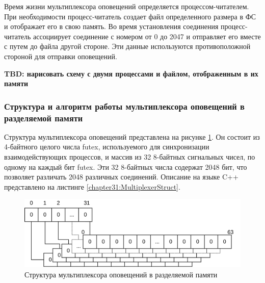 Время жизни мультиплексора оповещений определяется процессом-читателем. При необходимости процесс-читатель создает файл определенного размера в ФС и отображает его в свою память. Во время установления соединения процесс-читатель ассоциирует соединение с номером от 0 до 2047 и отправляет его вместе с путем до файла другой стороне. Эти данные используются противоположной стороной для отправки оповещений.

\textbf{TBD: нарисовать схему с двумя процессами и файлом, отображенным в их памяти}

\subsubsection{Структура и алгоритм работы мультиплексора оповещений в разделяемой памяти}\label{chapter31:MuxStructure}

Структура мультиплексора оповещений представлена на рисунке \ref{chapter31:MuxZeroState}. Он состоит из 4-байтного целого числа futex, используемого для синхронизации взаимодействующих процессов, и массив из 32 8-байтных сигнальных чисел, по одному на каждый бит futex. Эти 32 8-байтных числа содержат 2048 бит, что позволяет различать 2048 различных соединений. Описание на языке C++ представлено на листинге \ref{chapter31:MultiplexerStruct}.


\begin{figure}[!h]
\caption{Структура мультиплексора оповещений в разделяемой памяти}
\label{chapter31:MuxZeroState}
\includegraphics[width=\textwidth]{../../graphics/schemes/futex}
\end{figure}

